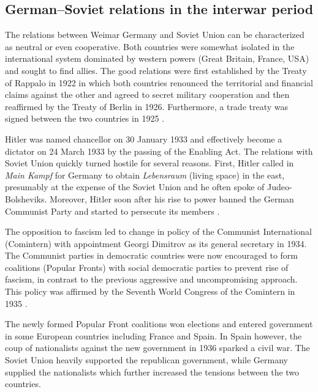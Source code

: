 \subsection{German–Soviet relations in the interwar period} \label{subsec:relations}
The relations between Weimar Germany and Soviet Union can be characterized as neutral or even cooperative. Both countries were somewhat isolated in the international system dominated by western powers (Great Britain, France, USA) and sought to find allies. The good relations were first established by the Treaty of Rappalo in 1922 in which both countries renounced the territorial and financial claims against the other and agreed to secret military cooperation \citep{gatzke_russo-german_1958} and then reaffirmed by the Treaty of Berlin in 1926. Furthermore, a trade treaty was signed between the two countries in 1925 \citep{morgan_political_1963}.

Hitler was named chancellor on 30 January 1933 and effectively become a dictator on 24 March 1933 by the passing of the Enabling Act. 
The relations with Soviet Union quickly turned hostile for several reasons.  First, Hitler called in \emph{Main Kampf} for Germany to obtain \emph{Lebensraum} (living space) in the east, presumably at the expense of the Soviet Union and he often spoke of Judeo-Bolsheviks. Moreover, Hitler soon after his rise to power banned the German Communist Party and started to persecute its members  \citep{haslam_soviet_1984}. 

The opposition to fascism led to change in policy of the Communist International (Comintern)  with appointment Georgi Dimitrov as  its general secretary in 1934. The Communist parties in democratic countries were now encouraged to form coalitions (Popular Fronts) with social democratic parties to prevent rise of fascism, in contrast to the previous aggressive and uncompromising approach. This policy was affirmed by the Seventh World Congress of the Comintern in 1935 \citep{haslam_comintern_1979}.

The newly formed Popular Front coalitions won elections and entered government in some European countries including France and Spain. In Spain however, the coup of nationalists against the new government in 1936 sparked a civil war. The Soviet Union heavily supported the republican government, while Germany supplied the nationalists which further increased the tensions between the two countries. 

